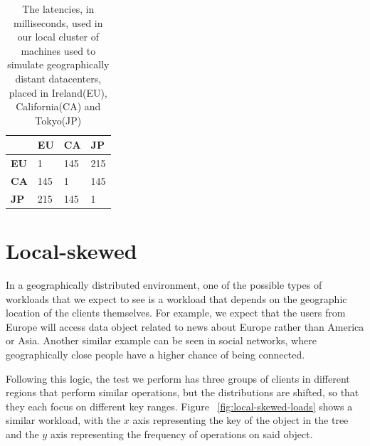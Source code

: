 \begin{table}[!htb]
  \centering
  \begin{tabular}{l l l l}
    \hline
    & \textbf{EU} & \textbf{CA} & \textbf{JP} \\
    \hline
    \textbf{EU} & 1 & 145 & 215 \\
    \textbf{CA} & 145 & 1 & 145 \\
    \textbf{JP} & 215 & 145 & 1 \\
    \hline
  \end{tabular}
  \caption{The latencies, in milliseconds, used in our local cluster of machines used to simulate geographically distant datacenters, placed in Ireland(EU), California(CA) and Tokyo(JP)}\label{tab:latencies}
\end{table}


\section{Local-skewed}\label{sec:local-skewed}
In a geographically distributed environment, one of the possible types of workloads that we expect to see is a workload that depends on the geographic location of the clients themselves. For example, we expect that the users from Europe will access data object related to news about Europe rather than America or Asia. Another similar example can be seen in social networks, where geographically close people have a higher chance of being connected.

Following this logic, the test we perform has three groups of clients in different regions that perform similar operations, but the distributions are shifted, so that they each focus on different key ranges. Figure ~\ref{fig:local-skewed-loads} shows a similar workload, with the $x$ axis representing the key of the object in the tree and the $y$ axis representing the frequency of operations on said object.

